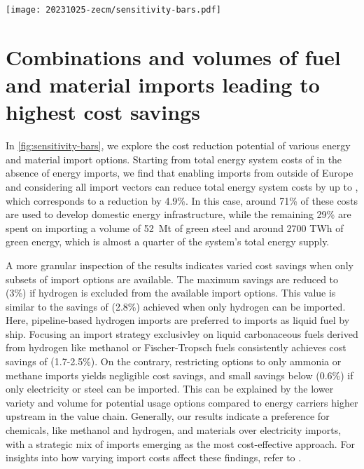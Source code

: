 

\begin{figure*}
    \texttt{[image: 20231025-zecm/sensitivity-bars.pdf]}
    \caption{\textbf{Potential for cost reductions with reduced sets of import options.}
        Subsets of available import options are sorted by ascending cost reduction potential. 
        Top panel shows profile of total cost savings.
        Bottom panel shows composition and extent of imports in relation to total energy system costs.
        Percentage numbers in bar plot indicate the share of total system costs spent on domestic energy infrastructure.
        Alternative versions of this figure with higher and lower import cost assumptions are included in the supplementary material.
    }
    \label{fig:sensitivity-bars}
\end{figure*}

\section*{Combinations and volumes of fuel and material imports leading to highest cost savings}

In \cref{fig:sensitivity-bars}, we explore the cost reduction potential of
various energy and material import options. Starting from total energy system
costs of  in the absence of energy imports, we find that enabling
imports from outside of Europe and considering all import vectors can reduce
total energy system costs by up to , which corresponds to a reduction
by 4.9\%. In this case, around 71\% of these costs are used to develop domestic
energy infrastructure, while the remaining 29\% are spent on importing a volume
of 52~Mt of green steel and around 2700 TWh of green energy, which is almost a
quarter of the system's total energy supply.

A more granular inspection of the results indicates varied cost savings when
only subsets of import options are available. The maximum savings are reduced to
 (3\%) if hydrogen is excluded from the available import options.
This value is similar to the savings of  (2.8\%) achieved when only
hydrogen can be imported. Here, pipeline-based hydrogen imports are preferred to
imports as liquid fuel by ship. Focusing an import strategy exclusivley on
liquid carbonaceous fuels derived from hydrogen like methanol or Fischer-Tropsch
fuels consistently achieves cost savings of  (1.7-2.5\%). On the
contrary, restricting options to only ammonia or methane imports yields
negligible cost savings, and small savings below  (0.6\%) if only
electricity or steel can be imported. This can be explained by the lower variety
and volume for potential usage options compared to energy carriers higher
upstream in the value chain. Generally, our results indicate a preference for
chemicals, like methanol and hydrogen, and materials over electricity imports,
with a strategic mix of imports emerging as the most cost-effective approach.
For insights into how varying import costs affect these findings, refer to
. 

